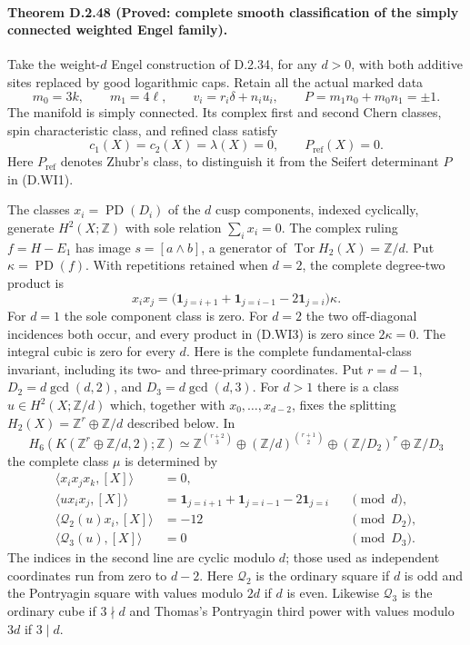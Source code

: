 \paragraph{Theorem D.2.48 (Proved: complete smooth classification of the simply connected weighted Engel family).}
Take the weight-$d$ Engel construction of D.2.34, for any $d>0$,
with both additive sites replaced by good logarithmic caps.  Retain
all the actual marked data
\[
 m_0=3k,\qquad m_1=4\ell,\qquad
 v_i=r_i\delta+n_i u_i,\qquad
 P=m_1n_0+m_0n_1=\pm1 .
 \tag{D.WI1}
\]
The manifold is simply connected.  Its complex first and second
Chern classes, spin characteristic class, and refined class satisfy
\[
 c_1(X)=c_2(X)=\lambda(X)=0,\qquad P_{\mathrm{ref}}(X)=0.
 \tag{D.WI2}
\]
Here $P_{\mathrm{ref}}$ denotes Zhubr's class, to distinguish it from
the Seifert determinant $P$ in (D.WI1).

The classes $x_i=\operatorname{PD}(D_i)$ of the $d$ cusp components,
indexed cyclically, generate $H^2(X;\mathbb Z)$ with sole relation
$\sum_i x_i=0$.  The complex ruling $f=H-E_1$ has image
$s=[a\wedge b]$, a generator of $\operatorname{Tor}H_2(X)=\mathbb Z/d$.
Put $\kappa=\operatorname{PD}(f)$.  With repetitions retained when
$d=2$, the complete degree-two product is
\[
 x_i x_j=
 \bigl(\mathbf1_{j=i+1}+\mathbf1_{j=i-1}-2\mathbf1_{j=i}\bigr)\kappa.
 \tag{D.WI3}
\]
For $d=1$ the sole component class is zero.  For $d=2$ the two
off-diagonal incidences both occur, and every product in (D.WI3)
is zero since $2\kappa=0$.  The integral cubic is zero for every $d$.
Here is the complete fundamental-class invariant, including its
two- and three-primary coordinates. Put
$r=d-1$, $D_2=d\gcd(d,2)$, and $D_3=d\gcd(d,3)$.
For $d>1$ there is a class $u\in H^2(X;\mathbb Z/d)$
which, together with $x_0,\ldots,x_{d-2}$, fixes the splitting
$H_2(X)=\mathbb Z^r\oplus\mathbb Z/d$ described below. In
\[
 H_6(K(\mathbb Z^r\oplus\mathbb Z/d,2);\mathbb Z)
 \simeq
 \mathbb Z^{\binom{r+2}{3}}\oplus
 (\mathbb Z/d)^{\binom{r+1}{2}}\oplus
 (\mathbb Z/D_2)^r\oplus\mathbb Z/D_3
 \tag{D.WI14}
\]
the complete class $\mu$ is determined by
\[
 \begin{aligned}
 \langle x_i x_j x_k,[X]\rangle&=0,\\
 \langle u x_i x_j,[X]\rangle
    &=\mathbf1_{j=i+1}+\mathbf1_{j=i-1}-2\mathbf1_{j=i}
                                                     &&\pmod d,\\
 \langle \mathcal Q_2(u)x_i,[X]\rangle&=-12             &&\pmod {D_2},\\
 \langle \mathcal Q_3(u),[X]\rangle&=0                 &&\pmod {D_3}.
 \end{aligned}
 \tag{D.WI15}
\]
The indices in the second line are cyclic modulo $d$; those
used as independent coordinates run from zero to $d-2$.
Here $\mathcal Q_2$ is the ordinary square if $d$ is odd and
the Pontryagin square with values modulo $2d$ if $d$ is even.
Likewise $\mathcal Q_3$ is the ordinary cube if $3\nmid d$
and Thomas's Pontryagin third power with values modulo $3d$
if $3\mid d$.


